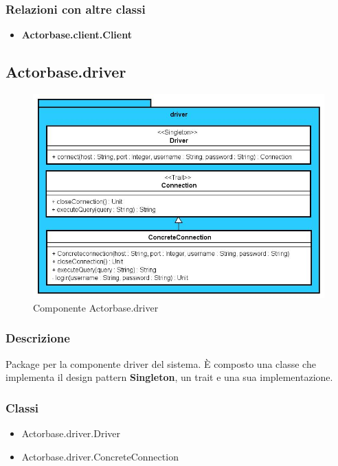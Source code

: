 \documentclass[a4paper]{article}
\begin{document}
			\subsubsection{Relazioni con altre classi}
				\begin{itemize}
					\item \textbf{Actorbase.client.Client}
				\end{itemize}
				
		\subsection{Actorbase.driver}
		
			\begin{figure}[H]
				\centering
				\includegraphics[width=\textwidth]{ST/Driver/driverLevel.jpg}
				\caption{Componente Actorbase.driver}
			\end{figure}
			\subsubsection{Descrizione}
				Package per la componente driver del sistema. 
				È composto una classe che implementa il design pattern \textbf{Singleton}, un trait e una sua implementazione.
				
			\subsubsection{Classi}
				\begin{itemize}
					\item Actorbase.driver.Driver
					\item Actorbase.driver.ConcreteConnection
				\end{itemize}
			
\end{document}
